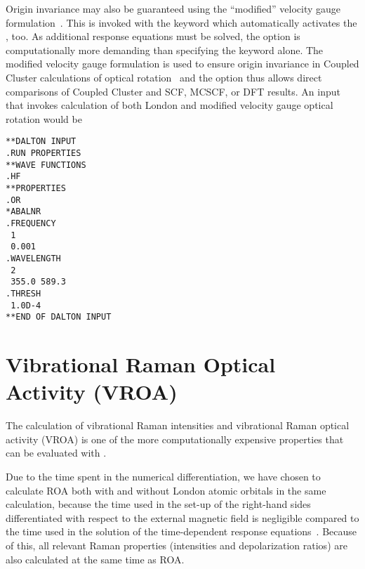 Origin invariance may also be guaranteed using the
``modified'' velocity
gauge
formulation~\cite{Pedersen:ORMVE}.
This is invoked with the 
keyword which automatically
activates the , too. As additional response equations
must be solved, the  option is computationally more demanding than
specifying the  keyword alone.
The modified velocity gauge formulation is used to ensure origin
invariance in Coupled Cluster calculations of optical
rotation~\cite{Pedersen:ORMVE} and the  option thus
allows direct comparisons of Coupled Cluster and
SCF, MCSCF, or DFT results.
An input that invokes calculation of both London and modified velocity gauge
optical rotation would be


\begin{verbatim}
**DALTON INPUT
.RUN PROPERTIES
**WAVE FUNCTIONS
.HF
**PROPERTIES
.OR
*ABALNR
.FREQUENCY
 1
 0.001
.WAVELENGTH
 2
 355.0 589.3
.THRESH
 1.0D-4
**END OF DALTON INPUT
\end{verbatim}

\section{Vibrational Raman Optical Activity (VROA)}\label{sec:vroa}

\begin{center}
\end{center}

The calculation of vibrational Raman intensities and vibrational Raman optical
activity (VROA)
is one of the more computationally expensive properties that can be
evaluated with \dalton .

Due to the time spent in the numerical differentiation, we have chosen
to calculate ROA both with and without London atomic
orbitals in the
same calculation, because the time used in the set-up of the right-hand
sides differentiated
with respect to the external magnetic field is negligible compared to
the time used in the solution of the time-dependent response
equations~\cite{thkrklbpjjofd99}. Because of this,  all relevant Raman
properties (intensities and depolarization ratios) are also calculated
at the same time as ROA.


